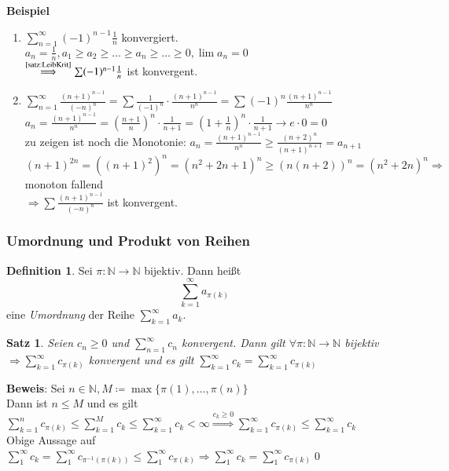 \documentclass[ngerman,titlepage,twoside, parskip=half*]{scrreprt}
\newcommand*{\N}{\mathbb{N}}
\theoremstyle{plain}
\newtheorem{theorem}{Satz}[section]
\theoremstyle{definition}
\newtheorem{definition}{Definition}
\theoremstyle{remark}
\begin{document}
\textbf{Beispiel} 
\begin{enumerate}
  \item $\sum_{n=1}^\infty (-1)^{n-1}\frac{1}{n}$ konvergiert. $a_n=\frac{1}{n}, a_1\geq a_2\geq \ldots \geq 
    a_n\geq \ldots \geq0, \lim a_n=0$\\
    $\stackrel{\text{\autoref{satz:LeibKrit}}}{\Longrightarrow} \sum (-1)^{n-1}\frac{1}{n}$ ist konvergent.
  \item $\sum_{n=1}^\infty \frac{(n+1)^{n-1}}{(-n)^n}=\sum \frac{1}{(-1)^n}\cdot \frac{(n+1)^{n-1}}{n^n}=\sum (-1)^n
    \frac{(n+1)^{n-1}}{n^n}$\\
    $a_n=\frac{(n+1)^{n-1}}{n^n}=(\frac{n+1}{n})^n\cdot \frac{1}{n+1}=(1+\frac{1}{n})^n\cdot \frac{1}{n+1}\rightarrow e
    \cdot 0=0$\\
    zu zeigen ist noch die Monotonie: $a_n=\frac{(n+1)^{n-1}}{n^n}\geq \frac{(n+2)^n}{(n+1)^{n+1}}=a_{n+1}$\\
    $(n+1)^{2n}=((n+1)^2)^n=(n^2+2n+1)^n\geq (n(n+2))^n=(n^2+2n)^n \Rightarrow$ monoton fallend\\
    $\Rightarrow \sum \frac{(n+1)^{n-1}}{(-n)^n}$ ist konvergent.
\end{enumerate}

\subsubsection{Umordnung und Produkt von Reihen}
\begin{definition}
Sei $\pi \colon\N\rightarrow \N$ bijektiv. Dann heißt
\[\sum_{k=1}^\infty a_{\pi(k)}\]
eine \emph{Umordnung} der Reihe $\sum_{k=1}^\infty a_k$.
\end{definition}

\begin{theorem}
\label{satz:umordnung}
Seien $c_n\geq 0$ und $\sum_{n=1}^\infty c_n$ konvergent. Dann gilt $\forall \pi \colon\N\rightarrow \N$ bijektiv
$\Rightarrow \sum_{k=1}^\infty c_{\pi(k)}$ konvergent und es gilt $\sum_{k=1}^\infty c_k=\sum_{k=1}^\infty c_{\pi(k)}$
\end{theorem}
\textbf{Beweis}: Sei $n \in \N, M\coloneqq\max\{\pi(1),\ldots ,\pi(n)\}$\\
Dann ist $n\leq M$ und es gilt $\sum_{k=1}^n c_{\pi(k)}\leq \sum_{k=1}^M c_k\leq \sum_{k=1}^\infty c_k<\infty 
\stackrel{c_k\geq 0}{\Rightarrow} \sum_{k=1}^\infty c_{\pi(k)}\leq \sum_{k=1}^\infty c_k$\\
Obige Aussage auf $\sum_1^\infty c_k=\sum_1^\infty c_{\pi^{-1}(\pi(k))}\leq \sum_1^\infty c_{\pi(k)} \Rightarrow
\sum_1^\infty c_k=\sum_1^\infty c_{\pi(k)}$\qed
\end{document}

